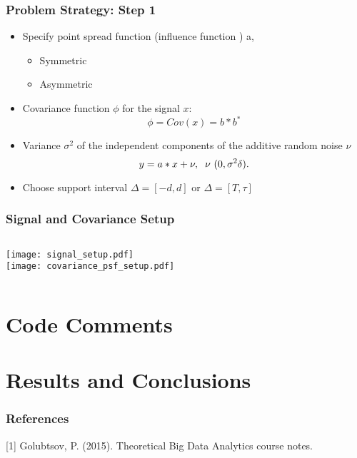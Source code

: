\documentclass[t]{beamer}
\begin{document}
\begin{frame}
\frametitle{Problem Strategy: Step 1}
\begin{itemize}
\item Specify point spread function (influence function ) a, 
\begin{itemize}
\item Symmetric
\item Asymmetric
\end{itemize}
\item Covariance function $\phi$ for the signal $x$: 
\begin{equation}
\phi = Cov(x) = b*b^{*}
\end{equation}
\item Variance $\sigma^2$ of the independent components of the additive random noise $\nu$
\begin{equation}
y = a*x+\nu, \hspace{.2cm} \nu ~(0,\sigma^2\delta). 
\end{equation}
\item Choose support interval $\Delta = [-d,d] $ or $\Delta = [T,\tau]$
\end{itemize}
\end{frame}
\begin{frame}
\frametitle{Signal and Covariance Setup}

\begin{columns}[t]
\centering
\texttt{[image: signal\_setup.pdf]}\\
\texttt{[image: covariance\_psf\_setup.pdf]}
\end{columns}

\end{frame}
\section{Code Comments}
\section{Results and Conclusions}
\begin{frame}
\frametitle{References}

[1] Golubtsov, P. (2015). Theoretical Big Data Analytics course notes.

\end{frame}
\end{document}
